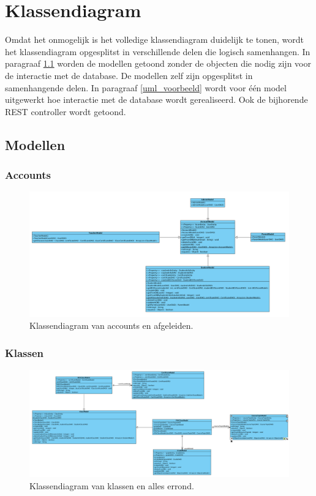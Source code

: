 \documentclass[a4paper]{article}
\begin{document}
\clearpage
\section{Klassendiagram}
Omdat het onmogelijk is het volledige klassendiagram duidelijk te tonen, wordt het klassendiagram opgesplitst in verschillende delen die logisch samenhangen. In paragraaf \ref{uml_modellen} worden de modellen getoond zonder de objecten die nodig zijn voor de interactie met de database. De modellen zelf zijn opgesplitst in samenhangende delen. In paragraaf \ref{uml_voorbeeld} wordt voor \'e\'en model uitgewerkt hoe interactie met de database wordt gerealiseerd. Ook de bijhorende REST controller wordt getoond.

\subsection{Modellen} \label{uml_modellen}
\subsubsection{Accounts}
\begin{figure}[H]
  \includegraphics[width=\textwidth]{uml_accounts}
  \caption{Klassendiagram van accounts en afgeleiden.}
  \label{fig:uml_accounts}
\end{figure}

\subsubsection{Klassen}
\begin{figure}[H]
  \includegraphics[width=\textwidth]{uml_klassen}
  \caption{Klassendiagram van klassen en alles errond.}
  \label{fig:uml_klassen}
\end{figure}
\end{document}
